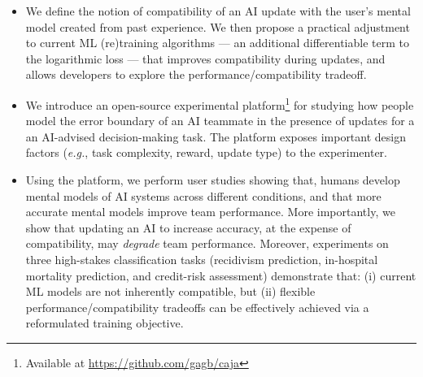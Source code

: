 \documentclass[letterpaper]{article} %
\newcommand{\bug}
    {\mbox{\rule{2mm}{2mm}}}
\newcommand{\Bug}[1]
    {\bug \footnote{BUG: {#1}}}
\newcommand{\eg}{\mbox{\it e.g.}}
\newcommand{\?}{\mbox{?}}
\begin{document}
\begin{itemize}
\item We define the notion of compatibility of an AI update with the user's mental model created from past experience.
We then propose a practical adjustment to current ML (re)training algorithms --- an additional differentiable term to the logarithmic loss --- that improves compatibility during updates, 
and allows developers to explore the performance/compatibility tradeoff.

\item We introduce an open-source experimental platform\footnote{Available at \url{https://github.com/gagb/caja}} for 
studying how people model the error boundary of an AI teammate in the presence of updates for a an AI-advised decision-making task. %
The platform exposes important design factors (\eg, task complexity, reward, update type) to the experimenter. 

\item Using the platform, we perform user studies showing that, humans develop mental models of AI systems across different conditions, and that more accurate mental models improve team performance. More importantly, we show that updating an AI to increase accuracy, at the expense of compatibility, may {\em degrade} team performance. 
 Moreover, experiments on three high-stakes classification tasks (recidivism prediction, in-hospital mortality prediction, and credit-risk assessment) demonstrate that: (i) current ML models are not inherently compatible, but (ii) flexible performance/compatibility tradeoffs can be effectively achieved via a reformulated training objective.



\end{itemize}
\end{document}
